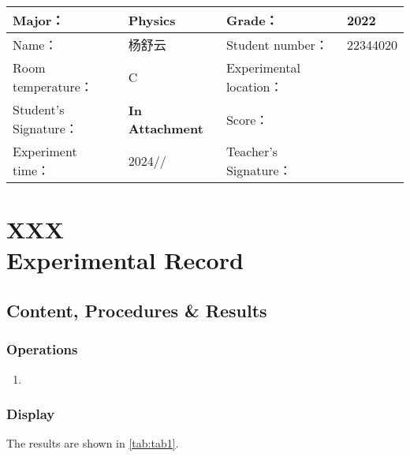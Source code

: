 
\begin{table}
	\renewcommand\arraystretch{1.7}
	\centering
	\begin{tabularx}{\textwidth}{|X|X|X|X|}
		\hline
		Major： & Physics & Grade： & 2022 \\
		\hline
		Name： & 杨舒云 & Student number： & 22344020\\
		\hline
		Room temperature： & \degree C & Experimental location： &  \\
		\hline
		Student's Signature：& \textbf{In Attachment} & Score： &\\
		\hline
		Experiment time：& 2024// & Teacher's Signature：&\\
		\hline
	\end{tabularx}
\end{table}
\section{XXX \\ Experimental Record}


\subsection{Content, Procedures \& Results}

\subsubsection{Operations}
\begin{enumerate}
	\item 
\end{enumerate}	

\subsubsection{Display}

The results are shown in \cref{tab:tab1}.

